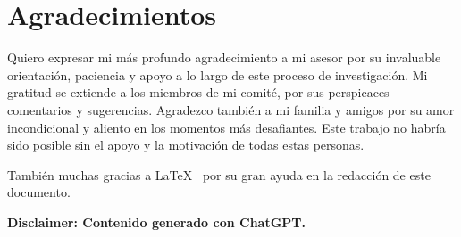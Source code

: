 \chapter{Agradecimientos}

Quiero expresar mi más profundo agradecimiento a mi asesor por su invaluable orientación, paciencia y apoyo a lo largo de este proceso de investigación. Mi gratitud se extiende a los miembros de mi comité, por sus perspicaces comentarios y sugerencias. Agradezco también a mi familia y amigos por su amor incondicional y aliento en los momentos más desafiantes. Este trabajo no habría sido posible sin el apoyo y la motivación de todas estas personas.

También muchas gracias a LaTeX~\cite{lamport94} por su gran ayuda en la redacción de este documento.

\textbf{Disclaimer: Contenido generado con ChatGPT.}